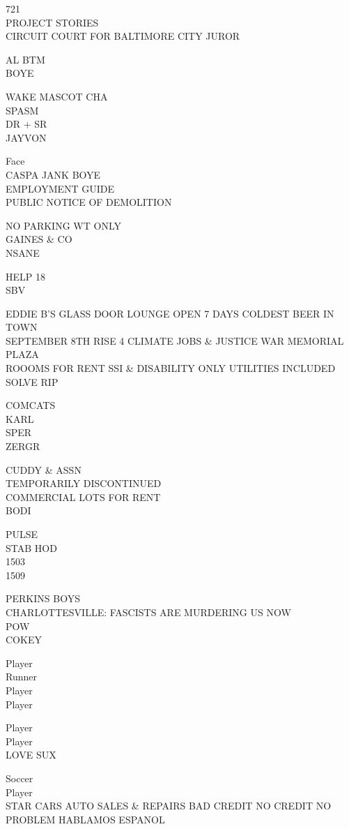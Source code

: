 \documentclass[10pt,letterpaper]{article}
\begin{document}
721\\
PROJECT STORIES\\
CIRCUIT COURT FOR BALTIMORE CITY JUROR

AL BTM\\
BOYE

WAKE MASCOT CHA\\
SPASM\\
DR + SR\\
JAYVON

Face\\
CASPA JANK BOYE\\
EMPLOYMENT GUIDE\\
PUBLIC NOTICE OF DEMOLITION

NO PARKING WT ONLY\\
GAINES \& CO\\
NSANE

HELP 18\\
SBV

EDDIE B'S GLASS DOOR LOUNGE OPEN 7 DAYS COLDEST BEER IN TOWN\\
SEPTEMBER 8TH RISE 4 CLIMATE JOBS \& JUSTICE WAR MEMORIAL PLAZA\\
ROOOMS FOR RENT SSI \& DISABILITY ONLY UTILITIES INCLUDED\\
SOLVE RIP

COMCATS\\
KARL\\
SPER\\
ZERGR

CUDDY \& ASSN\\
TEMPORARILY DISCONTINUED\\
COMMERCIAL LOTS FOR RENT\\
BODI

PULSE\\
STAB HOD\\
1503\\
1509

PERKINS BOYS\\
CHARLOTTESVILLE: FASCISTS ARE MURDERING US NOW\\
POW\\
COKEY

Player\\
Runner\\
Player\\
Player

Player\\
Player\\
LOVE SUX

Soccer\\
Player\\
STAR CARS AUTO SALES \& REPAIRS BAD CREDIT NO CREDIT NO PROBLEM HABLAMOS ESPANOL
\end{document}
